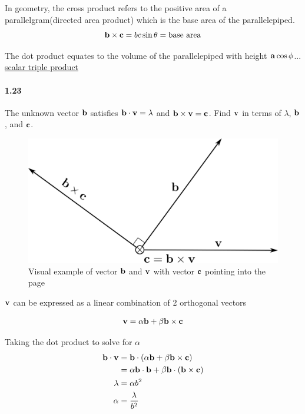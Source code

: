\documentclass[../problems.tex]{subfiles}
\begin{document}
In geometry, the cross product refers to the positive area of a parallelgram(directed area 
product) which is the base area of the parallelepiped.
\begin{equation*}
    \mathbf{b} \times \mathbf{c} = bc \sin{\theta} = \text{base area}
\end{equation*}

The dot product equates to the volume of the parallelepiped with height $\mathbf{a}\cos{\phi}$... 
\href{https://en.wikipedia.org/wiki/Triple_product}{scalar triple product}

\paragraph{1.23}
The unknown vector $\mathbf{b}$ satisfies $\mathbf{b} \cdot \mathbf{v} = \lambda$ and $\mathbf{b} \times 
\mathbf{v} = \mathbf{c}$. Find $\mathbf{v}$ in terms of $\lambda$, $\mathbf{b}$, and $\mathbf{c}$.
\barh

\begin{figure} [ht]
    \centering 
    \includegraphics[scale=0.9]{fig1_23.png}
    \caption{Visual example of vector $\mathbf{b}$ and $\mathbf{v}$ with vector $\mathbf{c}$ pointing 
    into the page}
    \label{fig1.5}
\end{figure}

$\mathbf{v}$ can be expressed as a linear combination of 2 orthogonal vectors

\begin{equation*}
    \mathbf{v} = \alpha \mathbf{b} + \beta \mathbf{b} \times \mathbf{c}
\end{equation*}

\newpage
Taking the dot product to solve for $\alpha$
\begin{align*}
    \mathbf{b} \cdot \mathbf{v} &= \mathbf{b} \cdot (\alpha \mathbf{b} 
    + \beta \mathbf{b} \times \mathbf{c}) \\
    &= \alpha \mathbf{b} \cdot \mathbf{b} + \beta \mathbf{b} \cdot (\mathbf{b} \times \mathbf{c}) \\
    \lambda &= \alpha b^2 \\
    \alpha &= \frac{\lambda}{b^2}
\end{align*}
\end{document}

